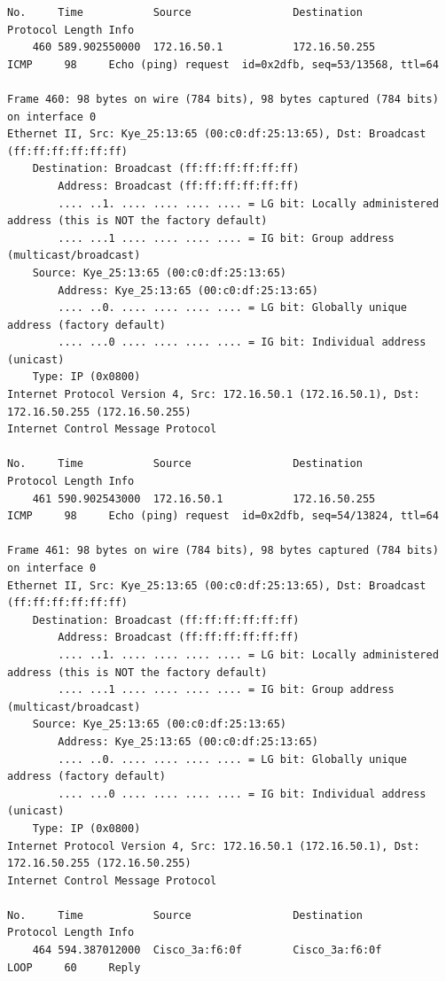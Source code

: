 \documentclass[a4paper,11pt]{article}
\begin{document}
\begin{lstlisting}
No.     Time           Source                Destination           Protocol Length Info
    460 589.902550000  172.16.50.1           172.16.50.255         ICMP     98     Echo (ping) request  id=0x2dfb, seq=53/13568, ttl=64

Frame 460: 98 bytes on wire (784 bits), 98 bytes captured (784 bits) on interface 0
Ethernet II, Src: Kye_25:13:65 (00:c0:df:25:13:65), Dst: Broadcast (ff:ff:ff:ff:ff:ff)
    Destination: Broadcast (ff:ff:ff:ff:ff:ff)
        Address: Broadcast (ff:ff:ff:ff:ff:ff)
        .... ..1. .... .... .... .... = LG bit: Locally administered address (this is NOT the factory default)
        .... ...1 .... .... .... .... = IG bit: Group address (multicast/broadcast)
    Source: Kye_25:13:65 (00:c0:df:25:13:65)
        Address: Kye_25:13:65 (00:c0:df:25:13:65)
        .... ..0. .... .... .... .... = LG bit: Globally unique address (factory default)
        .... ...0 .... .... .... .... = IG bit: Individual address (unicast)
    Type: IP (0x0800)
Internet Protocol Version 4, Src: 172.16.50.1 (172.16.50.1), Dst: 172.16.50.255 (172.16.50.255)
Internet Control Message Protocol

No.     Time           Source                Destination           Protocol Length Info
    461 590.902543000  172.16.50.1           172.16.50.255         ICMP     98     Echo (ping) request  id=0x2dfb, seq=54/13824, ttl=64

Frame 461: 98 bytes on wire (784 bits), 98 bytes captured (784 bits) on interface 0
Ethernet II, Src: Kye_25:13:65 (00:c0:df:25:13:65), Dst: Broadcast (ff:ff:ff:ff:ff:ff)
    Destination: Broadcast (ff:ff:ff:ff:ff:ff)
        Address: Broadcast (ff:ff:ff:ff:ff:ff)
        .... ..1. .... .... .... .... = LG bit: Locally administered address (this is NOT the factory default)
        .... ...1 .... .... .... .... = IG bit: Group address (multicast/broadcast)
    Source: Kye_25:13:65 (00:c0:df:25:13:65)
        Address: Kye_25:13:65 (00:c0:df:25:13:65)
        .... ..0. .... .... .... .... = LG bit: Globally unique address (factory default)
        .... ...0 .... .... .... .... = IG bit: Individual address (unicast)
    Type: IP (0x0800)
Internet Protocol Version 4, Src: 172.16.50.1 (172.16.50.1), Dst: 172.16.50.255 (172.16.50.255)
Internet Control Message Protocol

No.     Time           Source                Destination           Protocol Length Info
    464 594.387012000  Cisco_3a:f6:0f        Cisco_3a:f6:0f        LOOP     60     Reply


\end{lstlisting}
\end{document}
